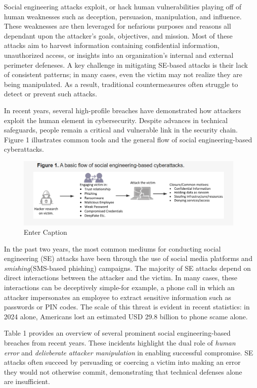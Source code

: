 Social engineering attacks exploit, or hack human vulnerabilities playing off of human weaknesses such as deception, persuasion, manipulation, and influence. These weaknesses are then leveraged for nefarious purposes and reasons all dependant upon the attacker's goals, objectives, and mission. Most of these attacks aim to harvest information containing confidential information, unauthorized access, or insights into an organization's internal and external perimeter defeneses. A key challenge in mitigating SE-based attacks is their lack of consistent patterns; in many cases, even the victim may not realize they are being manipulated. As a result, traditional countermeasures often struggle to detect or prevent such attacks.

In recent years, several high-profile breaches have demonstrated how attackers exploit the human element in cybersecurity. Despite advances in technical safeguards, people remain a critical and vulnerable link in the security chain. Figure 1 illustrates common tools and the general flow of social engineering-based cyberattacks.

\begin{figure}
    \centering
    \includegraphics[width=1\linewidth]{soceng.png}
    \caption{Enter Caption}
    \label{fig:placeholder}
\end{figure}
In the past two years, the most common mediums for conducting social engineering (SE) attacks have been through the use of social media platforms and \textit{smishing}(SMS-based phishing) campaigns. The majority of SE attacks depend on direct interactions between the attacker and the victim. In many cases, these interactions can be deceptively simple-for example, a phone call in which an attacker impersonates an employee to extract sensitive information such as passwords or PIN codes. The scale of this threat is evident in recent statistics: in 2024 alone, Americans lost an estimated USD 29.8 billion to phone scame alone.

Table 1 provides an overview of several prominent social engineering-based breaches from recent years. These incidents highlight the dual role of \textit{human error} and \textit{delivberate attacker manipulation} in enabling successful compromise. SE attacks often succeed by persuading or coercing a victim into making an error they would not otherwise commit, demonstrating that technical defenses alone are insufficient.

